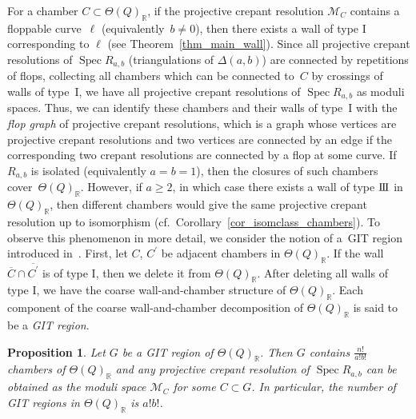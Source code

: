 \documentclass[10pt,a4paper]{amsart}
\numberwithin{equation}{section}
\newtheorem{Proposition}[Theorem]{Proposition}
\theoremstyle{definition}
\newcommand{\RR}{\mathbb{R}}
\newcommand{\calM}{\mathcal{M}}
\newcommand{\Spec}{\operatorname{Spec}}
\newcommand{\typeIII}{{\rm I\hspace{-0.7pt}I\hspace{-0.7pt}I}}
\begin{document}
For a chamber $C\subset \Theta(Q)_\RR$, if the projective crepant resolution $\calM_C$ contains a floppable curve~$\ell$ (equivalently~$b\neq 0$),
then there exists a wall of type I corresponding to $\ell$ (see Theorem~\ref{thm_main_wall}).
Since all projective crepant resolutions of $\Spec R_{a,b}$ (triangulations of $\Delta(a,b)$) are connected by repetitions of flops,
collecting all chambers which can be connected to~$C$ by crossings of walls of type~I, we have all projective crepant resolutions of $\Spec R_{a,b}$
as moduli spaces.
Thus, we can identify these chambers and their walls of type~I with the \emph{flop graph} of projective crepant resolutions,
which is a graph whose vertices are projective crepant resolutions and two vertices are connected by an edge if the corresponding two crepant resolutions are connected by a flop at some curve.
If $R_{a,b}$ is isolated (equivalently $a=b=1$), then the closures of such chambers cover~$\Theta(Q)_\RR$.
However, if $a\ge 2$, in which case there exists a wall of type $\typeIII$ in $\Theta(Q)_\RR$, then different chambers would give the same
projective crepant resolution up to isomorphism (cf.\ Corollary~\ref{cor_isomclass_chambers}).
To observe this phenomenon in more detail, we consider the notion of a~GIT region introduced in~\cite{BCS_GIT}.
First, let $C$, $C^\prime$ be adjacent chambers in $\Theta(Q)_\RR$.
If the wall $\overline{C}\cap\overline{C^\prime}$ is of type I, then we delete it from $\Theta(Q)_\RR$.
After deleting all walls of type I, we have the coarse wall-and-chamber structure of $\Theta(Q)_\RR$.
Each component of the coarse wall-and-chamber decomposition of $\Theta(Q)_\RR$ is said to be a \emph{GIT region}.

\begin{Proposition}\label{prop_numberx_gallery}
Let $G$ be a GIT region of $\Theta(Q)_\RR$. Then $G$ contains $\frac{n!}{a!b!}$ chambers of $\Theta(Q)_\RR$ and
any projective crepant resolution of $\Spec R_{a,b}$ can be obtained as the moduli space $\calM_C$ for some $C\subset G$.
In particular, the number of GIT regions in $\Theta(Q)_\RR$ is $a! b!$.
\end{Proposition}
\end{document}
